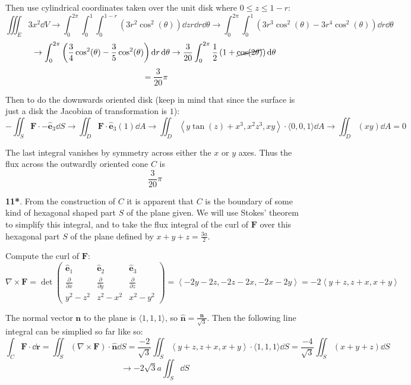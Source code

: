 \documentclass[11pt]{article}
\newcommand{\br}[1]{\left(#1\right)}
\begin{document}
Then use cylindrical coordinates taken over the unit disk where $0\leq z \leq 1-r$:
$$\iiint_E 3x^2 \dd{V} \to \int_0^{2\pi}\int_0^1\int_0^{1-r} \br{3r^2\cos^2(\theta)}\dd{z}r\dd{r}\dd{\theta} \to \int_0^{2\pi}\int_0^1 \br{3r^3\cos^2(\theta)-3r^4\cos^2(\theta)}\dd{r}\dd{\theta}$$
$$\to \int_0^{2\pi}\br{\frac{3}{4}\cos^2(\theta)-\frac{3}{5}\cos^2(\theta)}\dd{r}\dd{\theta} \to \frac{3}{20}\int_0^{2\pi}\frac{1}{2}\br{1+\cancel{\cos(2\theta)}}\dd{\theta}$$
$$=\frac{3}{20}\pi$$

Then to do the downwards oriented disk (keep in mind that since the surface is just a disk the Jacobian of transformation is $1$):
$$- \iint_S \mathbf{F}\cdot-\hat{\mathbf{e}}_3 \dd{S} \to  \iint_D \mathbf{F}\cdot\hat{\mathbf{e}}_3 (1)\dd{A} \to \iint_D \left\langle y\tan(z)+x^3, x^2z^3 ,xy \right\rangle \cdot \langle 0,0,1\rangle \dd{A} \to \iint_D (xy)\dd{A} = 0$$

The last integral vanishes by symmetry across either the $x$ or $y$ axes. Thus the flux across the outwardly oriented cone $C$ is 
$$\boxed{\frac{3}{20}\pi}$$

\noindent\makebox[\linewidth]{\rule{19.1cm}{0.4pt}}

\textbf{11*}. From the construction of $C$ it is apparent that $C$ is the boundary of some kind of hexagonal shaped part $S$ of the plane given. We will use Stokes' theorem to simplify this integral, and to take the flux integral of the curl of $\mathbf{F}$ over this hexagonal part $S$ of the plane defined by $x+y+z=\frac{3a}{2}$.

Compute the curl of $\mathbf{F}$:
$$\nabla \times \mathbf{F} = \det \begin{pmatrix}
    \hat{\mathbf{e}}_1 & \hat{\mathbf{e}}_2 & \hat{\mathbf{e}}_3 \\
    \frac{\partial}{\partial x} & \frac{\partial}{\partial y} & \frac{\partial}{\partial z} \\
    y^2-z^2 & z^2-x^2 & x^2-y^2
\end{pmatrix} = \left\langle -2y-2z, -2z-2x ,-2x-2y \right \rangle = -2\left\langle y+z, z+x ,x+y \right \rangle$$

The normal vector $\mathbf{n}$ to the plane is $\langle 1 , 1 , 1 \rangle$, so $\hat{\mathbf{n}} = \frac{\mathbf{n}}{\sqrt{3}}$. Then the following line integral can be simplied so far like so:
$$\int_C \mathbf{F}\cdot \dd{\mathbf{r}} = \iint_S \br{\nabla \times \mathbf{F}}\cdot \hat{\mathbf{n}}\dd{S} = \frac{-2}{\sqrt{3}}\iint_S \left\langle y+z, z+x ,x+y \right \rangle\cdot \langle 1 , 1 , 1 \rangle \dd{S} = \frac{-4}{\sqrt{3}}\iint_S \br{x+y+z}\dd{S}$$
$$\to -2\sqrt{3}a\iint_S\dd{S}$$
\end{document}
